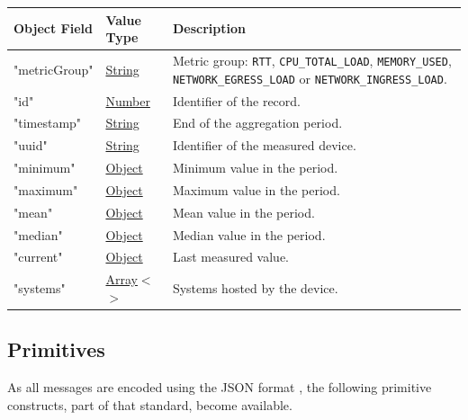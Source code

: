\documentclass[a4paper]{arrowhead}
\newcommand{\pref}[1]{{\textcolor{ArrowheadGrey}{\hyperref[sec:model:primitives:#1]{#1}}}}
\begin{document}
\noindent\begin{tabularx}{\textwidth}{| >{\raggedright\arraybackslash}p{3.9cm} | >{\raggedright\arraybackslash\small}p{5.3cm} | X |} \hline
\rowcolor{gray!33} Object Field & Value Type & Description \\ \hline
"metric\allowbreak{}Group" & \pref{String} & Metric group: \texttt{RTT}, \texttt{CPU\_\allowbreak{}TOTAL\_\allowbreak{}LOAD}, \texttt{MEMORY\_\allowbreak{}USED}, \texttt{NETWORK\_\allowbreak{}EGRESS\_\allowbreak{}LOAD} or \texttt{NETWORK\_\allowbreak{}INGRESS\_\allowbreak{}LOAD}. \\ \hline
"id" & \pref{Number} & Identifier of the record. \\ \hline
"timestamp" & \pref{String} & End of the aggregation period. \\ \hline
"uuid" & \pref{String} & Identifier of the measured device. \\ \hline
"minimum" & \pref{Object} & Minimum value in the period. \\ \hline
"maximum" & \pref{Object} & Maximum value in the period. \\ \hline
"mean" & \pref{Object} & Mean value in the period. \\ \hline
"median" & \pref{Object} & Median value in the period. \\ \hline
"current" & \pref{Object} & Last measured value. \\ \hline
"systems" & \pref{Array}$<$\allowbreak{}\pref{String}$>$ & Systems hosted by the device. \\ \hline
\end{tabularx}



\subsection{Primitives}
\label{sec:model:primitives}

As all messages are encoded using the JSON format \cite{rfc8259}, the following primitive constructs, part of that standard, become available.
\end{document}
